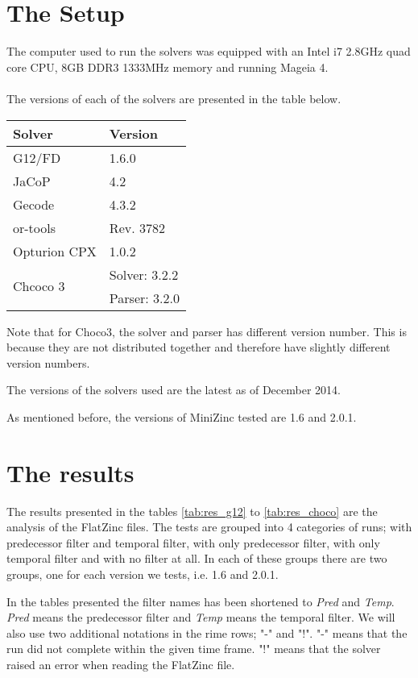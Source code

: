 \section{The Setup}
The computer used to run the solvers was equipped with an Intel i7 2.8GHz quad core CPU, 8GB DDR3 1333MHz memory and running Mageia 4.
\\\\
The versions of each of the solvers are presented in the table below.
\begin{table}[h]
\centering
\begin{tabular}{l|l}
Solver                    & Version \\ \hline
G12/FD                    & 1.6.0\\
JaCoP                     & 4.2 \\
Gecode                    & 4.3.2 \\
or-tools                  & Rev. 3782 \\
Opturion CPX              & 1.0.2 \\
\multirow{2}{*}{Chcoco 3} & Solver: 3.2.2 \\
                          & Parser: 3.2.0
\end{tabular}
\end{table}
Note that for Choco3, the solver and parser has different version number. This is because they are not distributed together and therefore have slightly different version numbers.

The versions of the solvers used are the latest as of December 2014.

As mentioned before, the versions of MiniZinc tested are 1.6 and 2.0.1.

\section{The results}\label{sec:res}
The results presented in the tables \ref{tab:res_g12} to \ref{tab:res_choco} are the analysis of the FlatZinc files. The tests are grouped into 4 categories of runs; with predecessor filter and temporal filter, with only predecessor filter, with only temporal filter and with no filter at all. In each of these groups there are two groups, one for each version we tests, i.e. 1.6 and 2.0.1.

In the tables presented the filter names has been shortened to \emph{Pred} and \emph{Temp}. \emph{Pred} means the predecessor filter and \emph{Temp} means the temporal filter. We will also use two additional notations in the rime rows; "-" and "!". "-" means that the run did not complete within the given time frame. "!" means that the solver raised an error when reading the FlatZinc file.


